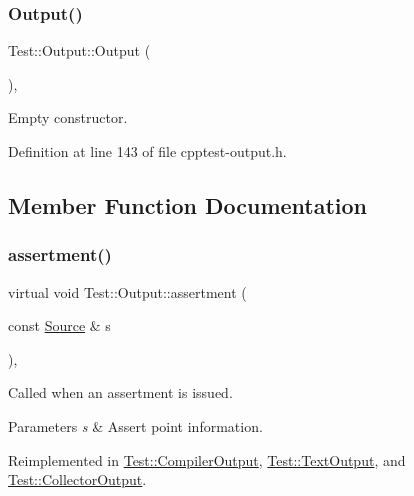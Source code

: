 \subsubsection{\texorpdfstring{Output()}{Output()}}
{\footnotesize\ttfamily Test\+::\+Output\+::\+Output (\begin{DoxyParamCaption}{ }\end{DoxyParamCaption})\hspace{0.3cm}{\ttfamily [inline]}, {\ttfamily [protected]}}

Empty constructor. 

Definition at line 143 of file cpptest-\/output.\+h.



\subsection{Member Function Documentation}
\mbox{\label{class_test_1_1_output_a48c31f0baa7627d81939be840c9a7f65}} 
\subsubsection{\texorpdfstring{assertment()}{assertment()}}
{\footnotesize\ttfamily virtual void Test\+::\+Output\+::assertment (\begin{DoxyParamCaption}\item[{const \mbox{\hyperlink{class_test_1_1_source}{Source}} \&}]{s }\end{DoxyParamCaption})\hspace{0.3cm}{\ttfamily [inline]}, {\ttfamily [virtual]}}

Called when an assertment is issued.


\begin{DoxyParams}{Parameters}
{\em s} & Assert point information. \\
\hline
\end{DoxyParams}


Reimplemented in \mbox{\hyperlink{class_test_1_1_compiler_output_a1c36e3fd12afe3556e887349b0b86b50}{Test\+::\+Compiler\+Output}}, \mbox{\hyperlink{class_test_1_1_text_output_a8110f86aa00f783fc5a91ec2f59a7998}{Test\+::\+Text\+Output}}, and \mbox{\hyperlink{class_test_1_1_collector_output_a96b61d5e53c3dfa1b98747bb582aa4f3}{Test\+::\+Collector\+Output}}.



